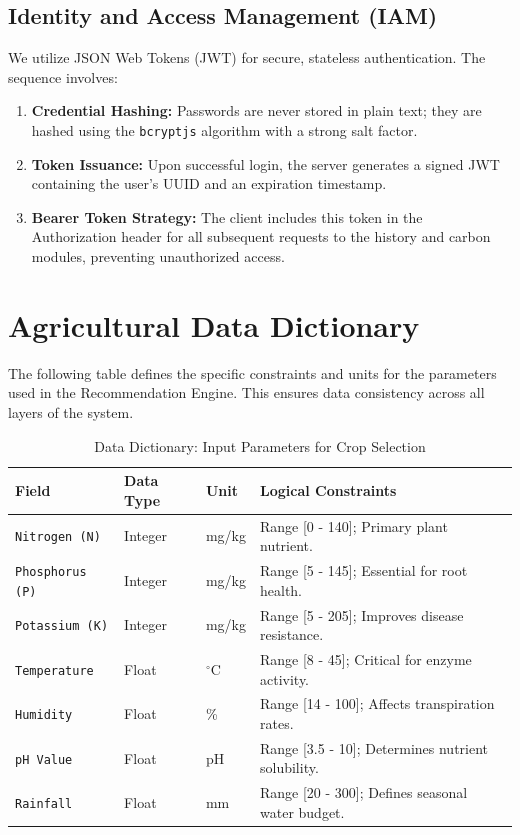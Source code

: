 \documentclass[12pt,a4paper]{report}
\begin{document}
\subsection{Identity and Access Management (IAM)}
We utilize JSON Web Tokens (JWT) for secure, stateless authentication. The sequence involves:
\begin{enumerate}
    \item \textbf{Credential Hashing:} Passwords are never stored in plain text; they are hashed using the \texttt{bcryptjs} algorithm with a strong salt factor.
    \item \textbf{Token Issuance:} Upon successful login, the server generates a signed JWT containing the user's UUID and an expiration timestamp.
    \item \textbf{Bearer Token Strategy:} The client includes this token in the Authorization header for all subsequent requests to the history and carbon modules, preventing unauthorized access.
\end{enumerate}

\section{Agricultural Data Dictionary}
\label{sec:4.7}
The following table defines the specific constraints and units for the parameters used in the Recommendation Engine. This ensures data consistency across all layers of the system.

\begin{table}[H]
    \centering
    \renewcommand{\arraystretch}{1.5}
    \begin{tabularx}{\textwidth}{|p{3cm}|p{2cm}|p{2cm}|X|}
        \hline
        \textbf{Field} & \textbf{Data Type} & \textbf{Unit} & \textbf{Logical Constraints} \\
        \hline
        \texttt{Nitrogen (N)} & Integer & mg/kg & Range [0 - 140]; Primary plant nutrient. \\
        \hline
        \texttt{Phosphorus (P)} & Integer & mg/kg & Range [5 - 145]; Essential for root health. \\
        \hline
        \texttt{Potassium (K)} & Integer & mg/kg & Range [5 - 205]; Improves disease resistance. \\
        \hline
        \texttt{Temperature} & Float & $^\circ$C & Range [8 - 45]; Critical for enzyme activity. \\
        \hline
        \texttt{Humidity} & Float & \% & Range [14 - 100]; Affects transpiration rates. \\
        \hline
        \texttt{pH Value} & Float & pH & Range [3.5 - 10]; Determines nutrient solubility. \\
        \hline
        \texttt{Rainfall} & Float & mm & Range [20 - 300]; Defines seasonal water budget. \\
        \hline
    \end{tabularx}
    \caption{Data Dictionary: Input Parameters for Crop Selection}
\end{table}
\end{document}
